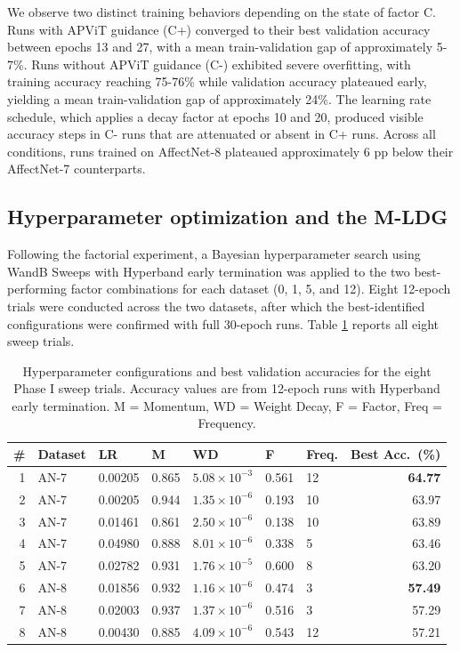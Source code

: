 We observe two distinct training behaviors depending on the state of factor C. Runs with APViT guidance (C+) converged to their best validation accuracy between epochs 13 and 27, with a mean train-validation gap of approximately 5-7\%. Runs without APViT guidance (C-) exhibited severe overfitting, with training accuracy reaching 75-76\% while validation accuracy plateaued early, yielding a mean train-validation gap of approximately 24\%. The learning rate schedule, which applies a decay factor at epochs 10 and 20, produced visible accuracy steps in C- runs that are attenuated or absent in C+ runs. Across all conditions, runs trained on AffectNet-8 plateaued approximately 6 pp below their AffectNet-7 counterparts.

\subsection{Hyperparameter optimization and the M-LDG}
\label{section:results-phase1-optim}

Following the factorial experiment, a Bayesian hyperparameter search using WandB Sweeps with Hyperband early termination \cite{hyperband2018} was applied to the two best-performing factor combinations for each dataset (0, 1, 5, and 12). Eight 12-epoch trials were conducted across the two datasets, after which the best-identified configurations were confirmed with full 30-epoch runs. Table \ref{tab:results-p1-sweep} reports all eight sweep trials.\\

\begin{table}[h!]
    \centering
    \begin{tabular}{@{}rllllllr@{}}
    \toprule
    \textbf{\#} & \textbf{Dataset} & \textbf{LR} & \textbf{M} & \textbf{WD} & \textbf{F} & \textbf{Freq.} & \textbf{Best Acc.\ (\%)} \\
    \midrule
    1 & AN-7 & 0.00205 & 0.865 & $5.08\times10^{-3}$ & 0.561 & 12 & \textbf{64.77} \\
    2 & AN-7 & 0.00205 & 0.944 & $1.35\times10^{-6}$ & 0.193 & 10 & 63.97 \\
    3 & AN-7 & 0.01461 & 0.861 & $2.50\times10^{-6}$ & 0.138 & 10 & 63.89 \\
    4 & AN-7 & 0.04980 & 0.888 & $8.01\times10^{-6}$ & 0.338 &  5 & 63.46 \\
    5 & AN-7 & 0.02782 & 0.931 & $1.76\times10^{-5}$ & 0.600 &  8 & 63.20 \\
    \midrule
    6 & AN-8 & 0.01856 & 0.932 & $1.16\times10^{-6}$ & 0.474 &  3 & \textbf{57.49} \\
    7 & AN-8 & 0.02003 & 0.937 & $1.37\times10^{-6}$ & 0.516 &  3 & 57.29 \\
    8 & AN-8 & 0.00430 & 0.885 & $4.09\times10^{-6}$ & 0.543 & 12 & 57.21 \\
    \bottomrule
    \end{tabular}
    \caption[Phase I hyperparameter sweep results]{Hyperparameter configurations and best validation accuracies for the eight Phase I sweep trials. Accuracy values are from 12-epoch runs with Hyperband early termination. M = Momentum, WD = Weight Decay, F = Factor, Freq = Frequency.}
    \label{tab:results-p1-sweep}
\end{table}

